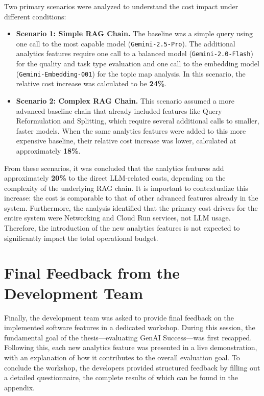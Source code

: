 \documentclass[
	english,
	ruledheaders=section,%
	class=report,%
	thesis={type=bachelor},%
	accentcolor=1b,%
	custommargins=true,%
	marginpar=false,%
	parskip=half-,%
	fontsize=11pt,%
	DIV=14,
]{tudapub}
\begin{document}
Two primary scenarios were analyzed to understand the cost impact under different conditions:

\begin{itemize}
    \item \textbf{Scenario 1: Simple RAG Chain.} The baseline was a simple query using one call to the most capable model (\texttt{Gemini-2.5-Pro}). The additional analytics features require one call to a balanced model (\texttt{Gemini-2.0-Flash}) for the quality and task type evaluation and one call to the embedding model (\texttt{Gemini-Embedding-001}) for the topic map analysis. In this scenario, the relative cost increase was calculated to be \textbf{24\%}.

    \item \textbf{Scenario 2: Complex RAG Chain.} This scenario assumed a more advanced baseline chain that already included features like Query Reformulation and Splitting, which require several additional calls to smaller, faster models. When the same analytics features were added to this more expensive baseline, their relative cost increase was lower, calculated at approximately \textbf{18\%}.
\end{itemize}

From these scenarios, it was concluded that the analytics features add approximately \textbf{20\%} to the direct LLM-related costs, depending on the complexity of the underlying RAG chain. It is important to contextualize this increase: the cost is comparable to that of other advanced features already in the system. Furthermore, the analysis identified that the primary cost drivers for the entire system were Networking and Cloud Run services, not LLM usage. Therefore, the introduction of the new analytics features is not expected to significantly impact the total operational budget.

\section{Final Feedback from the Development Team}
Finally, the development team was asked to provide final feedback on the implemented software features in a dedicated workshop. During this session, the fundamental goal of the thesis—evaluating GenAI Success—was first recapped. Following this, each new analytics feature was presented in a live demonstration, with an explanation of how it contributes to the overall evaluation goal. To conclude the workshop, the developers provided structured feedback by filling out a detailed questionnaire, the complete results of which can be found in the appendix.
\end{document}
